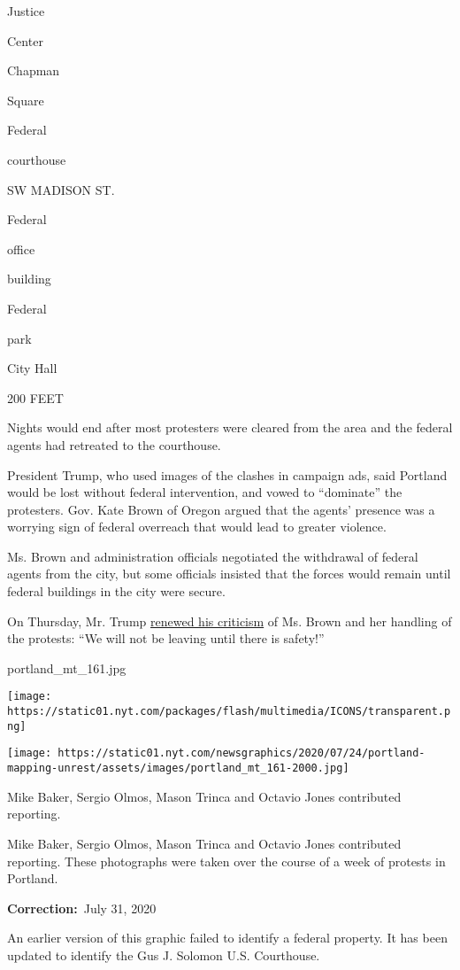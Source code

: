 Justice

Center

Chapman

Square

Federal

courthouse

SW MADISON ST.

Federal

office

building

Federal

park

City Hall

200 FEET

Nights would end after most protesters were cleared from the area and
the federal agents had retreated to the courthouse.

President Trump, who used images of the clashes in campaign ads, said
Portland would be lost without federal intervention, and vowed to
``dominate'' the protesters. Gov. Kate Brown of Oregon argued that the
agents' presence was a worrying sign of federal overreach that would
lead to greater violence.

Ms. Brown and administration officials negotiated the withdrawal of
federal agents from the city, but some officials insisted that the
forces would remain until federal buildings in the city were secure.

On Thursday, Mr. Trump
\href{https://twitter.com/realDonaldTrump/status/1288826742539464707}{renewed
his criticism} of Ms. Brown and her handling of the protests: ``We will
not be leaving until there is safety!''

portland\_mt\_161.jpg

\texttt{[image: https://static01.nyt.com/packages/flash/multimedia/ICONS/transparent.png]}

\texttt{[image: https://static01.nyt.com/newsgraphics/2020/07/24/portland-mapping-unrest/assets/images/portland\_mt\_161-2000.jpg]}

Mike Baker, Sergio Olmos, Mason Trinca and Octavio Jones contributed
reporting.

Mike Baker, Sergio Olmos, Mason Trinca and Octavio Jones contributed
reporting. These photographs were taken over the course of a week of
protests in Portland.

\textbf{Correction:}~July 31, 2020

An earlier version of this graphic failed to identify a federal
property. It has been updated to identify the Gus J. Solomon U.S.
Courthouse.


